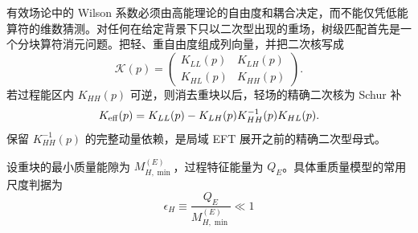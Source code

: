 有效场论中的 Wilson 系数必须由高能理论的自由度和耦合决定，而不能仅凭低能算符的维数猜测。对任何在给定背景下只以二次型出现的重场，树级匹配首先是一个分块算符消元问题。把轻、重自由度组成列向量，并把二次核写成
\begin{equation*}
 \mathcal K(p)=
 \begin{pmatrix}
  K_{LL}(p)&K_{LH}(p)\\
  K_{HL}(p)&K_{HH}(p)
 \end{pmatrix}.
\end{equation*}
若过程能区内 $K_{HH}(p)$ 可逆，则消去重块以后，轻场的精确二次核为 Schur 补
\begin{equation}
 {
 K_{\rm eff}(p)
 =K_{LL}(p)-K_{LH}(p)K_{HH}^{-1}(p)K_{HL}(p).}
 \label{eq:sm-heavy-block-schur-matching-dp85}
\end{equation}
 保留 $K_{HH}^{-1}(p)$ 的完整动量依赖，是局域 EFT 展开之前的精确二次型母式。

设重块的最小质量能隙为 $M_{H,\min}^{(E)}$，过程特征能量为 $Q_E$。具体重质量模型的常用尺度判据为
\begin{equation}
 {
 \epsilon_H\equiv\frac{Q_E}{M_{H,\min}^{(E)}}\ll1}
 \label{eq:sm-heavy-field-local-control-dp85}
\end{equation}

